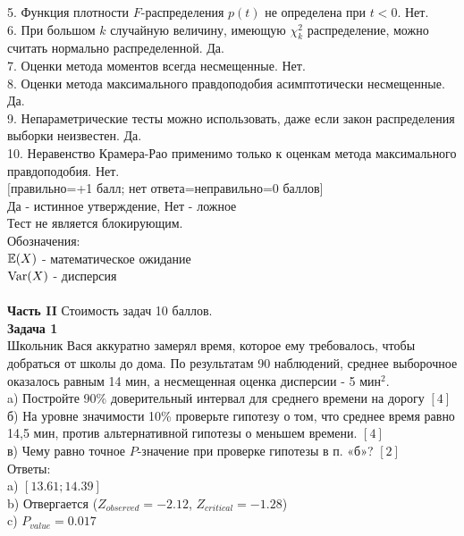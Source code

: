\documentclass[12pt, a4paper]{article}\usepackage[]{graphicx}\usepackage[]{color}
\begin{document}
5. Функция плотности $F$-распределения $p(t)$ не определена при $t<0$.  Нет. \\

6. При большом $k$ случайную величину, имеющую $\chi_{k}^{2}$ распределение, можно считать нормально распределенной. Да.  \\

7. Оценки метода моментов всегда несмещенные.  Нет. \\

8. Оценки метода максимального правдоподобия асимптотически несмещенные. Да.  \\

9. Непараметрические тесты можно использовать, даже если закон распределения выборки неизвестен. Да.  \\

10. Неравенство Крамера-Рао применимо только к оценкам метода максимального правдоподобия. Нет. \\



$[$правильно=+1 балл; нет ответа=неправильно=0 баллов$]$ \\
Да - истинное утверждение, Нет - ложное \\
Тест не является блокирующим. \\
Обозначения: \\
$\mathbb{E}(X)$ - математическое ожидание \\
$\operatorname{Var}(X)$ - дисперсия \\ \\

\textbf{Часть II} Стоимость задач 10 баллов. \\

\textbf{Задача 1} \\
Школьник Вася аккуратно замерял время, которое ему требовалось, чтобы добраться от школы до дома. По результатам 90 наблюдений, среднее выборочное оказалось равным 14 мин, а несмещенная оценка дисперсии - 5 мин$^{2}$. \\
a) Постройте 90\% доверительный интервал для среднего времени на дорогу $[4]$ \\
б) На уровне значимости 10\% проверьте гипотезу о том, что среднее время равно 14,5 мин, против альтернативной гипотезы о меньшем времени. $[4]$ \\
в) Чему равно точное $P$-значение при проверке гипотезы в п. «б»? $[2]$ \\
Ответы: \\
a) $[13.61;14.39]$ \\
b) Отвергается ($Z_{observed}=-2.12$, $Z_{critical}=-1.28$) \\
c) $P_{value}=0.017$ \\
\end{document}
